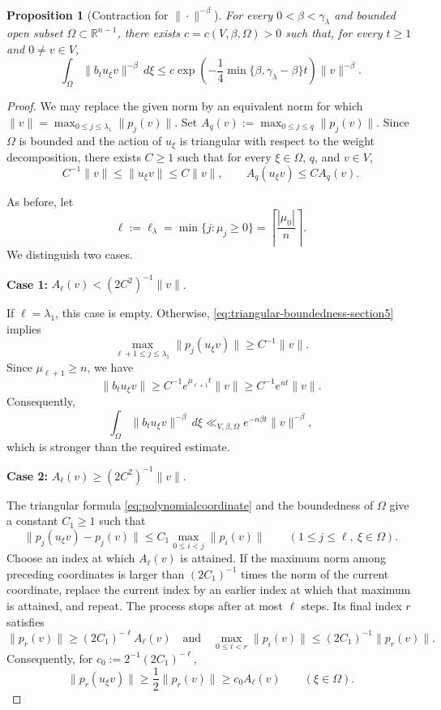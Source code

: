 \documentclass[reqno,11pt]{amsart}
\numberwithin{equation}{section}
\newtheorem{proposition}[theorem]{Proposition}
\theoremstyle{definition}
\theoremstyle{remark}
\begin{document}
\begin{proposition}[Contraction for $\|\cdot\|^{-\beta}$]
\label{prop:generallocalcontraction}
For every $0<\beta<\gamma_\lambda$ and bounded open subset
$\Omega\subset\mathbb R^{n-1}$, there exists
$c=c(V,\beta,\Omega)>0$ such that, for every $t\ge1$ and 
$0\ne v\in V$,
$$
\int_\Omega \|b_tu_\xi v\|^{-\beta}\,d\xi
\le
c\exp\!\left(-\frac14\min\{\beta,\gamma_\lambda-\beta\}t\right)
\|v\|^{-\beta}.
$$
\end{proposition}
\begin{proof}
We may replace the given norm by an equivalent norm for which
$\|v\|=\max_{0\le j\le\lambda_1}\|p_j(v)\|$.
Set
$A_q(v):=\max_{0\le j\le q}\|p_j(v)\|.
$
Since $\Omega$ is bounded and the action of $u_\xi$ is triangular with
respect to the weight decomposition, there exists $C\ge1$ such that for every $\xi\in\Omega$, $q$, and $v\in V$,
\begin{equation}
\label{eq:triangular-boundedness-section5}
C^{-1}\|v\|\le\|u_\xi v\|\le C\|v\|,
\qquad
A_q(u_\xi v)\le CA_q(v).
\end{equation}

As before, let
$$
\ell:=\ell_\lambda
=\min\{j:\mu_j\ge0\}
=\left\lceil\frac{|\mu_0|}{n}\right\rceil.
$$
We distinguish two cases.

\medskip
\noindent
\textbf{Case 1:} $A_\ell(v)<(2C^2)^{-1}\|v\|$.

If $\ell=\lambda_1$, this case is empty. Otherwise,
\eqref{eq:triangular-boundedness-section5} implies
$$
\max_{\ell+1\le j\le\lambda_1}\|p_j(u_\xi v)\|
\ge C^{-1}\|v\|.
$$
Since $\mu_{\ell+1}\ge n$, we have
$$
\|b_tu_\xi v\|
\ge C^{-1}e^{\mu_{\ell+1}t}\|v\|
\ge C^{-1}e^{nt}\|v\|.
$$
Consequently,
$$
\int_\Omega\|b_tu_\xi v\|^{-\beta}\,d\xi
\ll_{V,\beta,\Omega}e^{-n\beta t}\|v\|^{-\beta},
$$
which is stronger than the required estimate.

\medskip
\noindent
\textbf{Case 2:} $A_\ell(v)\ge(2C^2)^{-1}\|v\|$.

The triangular formula \eqref{eq:polynomialcoordinate} and the boundedness
of $\Omega$ give a constant $C_1\ge1$ such that
$$
\|p_j(u_\xi v)-p_j(v)\|
\le C_1\max_{0\le i<j}\|p_i(v)\|
\qquad(1\le j\le\ell,\ \xi\in\Omega).
$$
Choose an index at which $A_\ell(v)$ is attained. If the maximum norm among preceding coordinates is larger than $(2C_1)^{-1}$ times the norm of the current
coordinate, replace the current index by an earlier index at which that maximum is attained, and
repeat. The process stops after at most $\ell$ steps. Its final index $r$
satisfies
\begin{equation}
\label{eq:dominant-weight-coordinate}
\|p_r(v)\|\ge(2C_1)^{-\ell}A_\ell(v)
\quad\text{and}\quad
\max_{0\le i<r}\|p_i(v)\|
\le(2C_1)^{-1}\|p_r(v)\|.
\end{equation}
Consequently, for $c_0:=2^{-1}(2C_1)^{-\ell}$,
\begin{equation}
\label{eq:dominant-coordinate-stable}
\|p_r(u_\xi v)\|
\ge\frac12\|p_r(v)\|
\ge c_0A_\ell(v)
\qquad(\xi\in\Omega).
\end{equation}


\end{proof}
\end{document}
